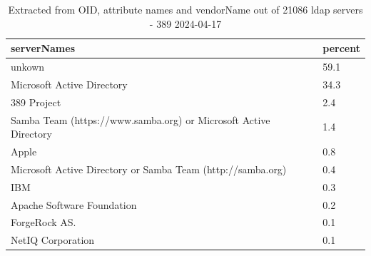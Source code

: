 \begin{table}[!ht]
\small
\centering
\begin{tabular}{ll}
\hline
serverNames & percent \\
\hline
unkown & 59.1 \\
Microsoft Active Directory & 34.3 \\
389 Project & 2.4 \\
Samba Team (https://www.samba.org) or Microsoft Active Directory & 1.4\\
Apple & 0.8 \\
Microsoft Active Directory or Samba Team (http://samba.org) & 0.4 \\
IBM & 0.3 \\
Apache Software Foundation & 0.2 \\
ForgeRock AS. & 0.1 \\
NetIQ Corporation & 0.1 \\
\end{tabular}
\caption{Extracted from OID, attribute names and vendorName out of 21086 ldap servers - 389 2024-04-17}
\label{tab:dump3}
\end{table}
